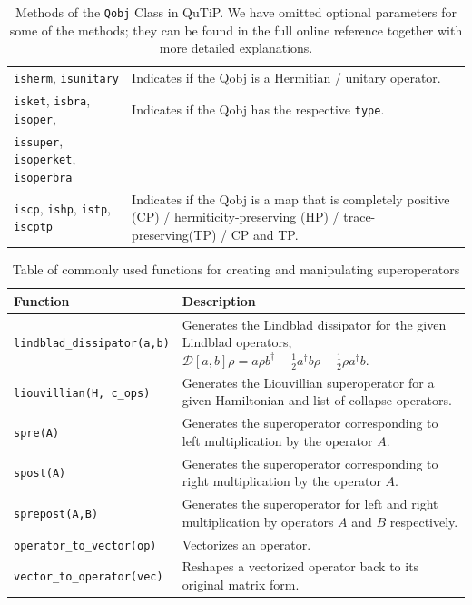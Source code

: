 \documentclass[preprint,3p,sort&compress]{elsarticle}
\def\code#1{\texttt{#1}}
\begin{document}
\begin{table}[!hp]
\begin{tabular}{@{}lp{10cm}@{}}
        \code{isherm}, \code{isunitary} & Indicates if the Qobj is a Hermitian / unitary operator. \\
   
        \code{isket}, \code{isbra}, \code{isoper}, & Indicates if the Qobj has the respective \code{type}. \\
        \code{issuper}, \code{isoperket}, \code{isoperbra} & \\
    
        \code{iscp}, \code{ishp}, \code{istp}, \code{iscptp} & Indicates if the Qobj is a map that is completely positive (CP) / hermiticity-preserving (HP) / trace-preserving(TP) / CP and TP. \\
        \bottomrule
    \end{tabular}
    \caption{Methods of the \code{Qobj} Class in QuTiP. We have omitted optional parameters for some of the methods; they can be found in the full online reference together with more detailed explanations.}
    \label{tab:qobj_methods}
\end{table}

\newpage

\begin{table}[!hp]
    \centering
     \renewcommand{\arraystretch}{1.3}
    \begin{tabular}{@{}lp{10cm}@{}}
        \toprule
        \textbf{Function} & \textbf{Description} \\
        \midrule
        \code{lindblad\_dissipator(a,b)} & Generates the Lindblad dissipator for the given Lindblad operators, $\mathcal{D}[a,b]\rho = a \rho b^\dagger -
\frac{1}{2}a^\dagger b\rho - \frac{1}{2}\rho a^\dagger b$. \\
  
        \code{liouvillian(H, c\_ops)} & Generates the Liouvillian superoperator for a given Hamiltonian and list of collapse operators. \\

        \code{spre(A)} & Generates the superoperator corresponding to left multiplication by the operator $A$. \\
  
        \code{spost(A)} & Generates the superoperator corresponding to right multiplication by the operator $A$.\\
     
        \code{sprepost(A,B)} & Generates the superoperator for left and right multiplication by operators $A$ and $B$ respectively. \\

        \code{operator\_to\_vector(op)} & Vectorizes an operator. \\

        \code{vector\_to\_operator(vec)} & Reshapes a vectorized operator back to its original matrix form. \\
\bottomrule
    \end{tabular}
    \caption{Table of commonly used functions for creating and manipulating superoperators}
    \label{tab:qutip_superoperators_functions}
\end{table}
\end{document}
